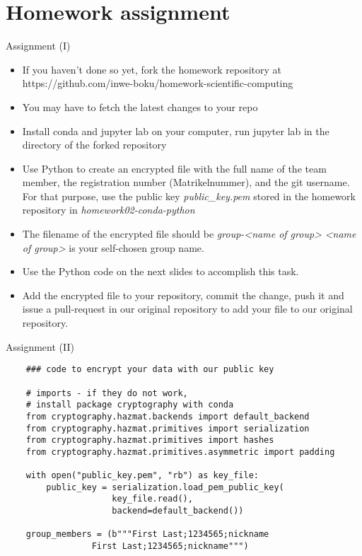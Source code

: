 \section{Homework assignment}

\begin{frame}{Assignment (I)}
	
	\begin{itemize}
		\item If you haven't done so yet, fork the homework repository at https://github.com/inwe-boku/homework-scientific-computing
		\item You may have to fetch the latest changes to your repo
		\item Install conda and jupyter lab on your computer, run jupyter lab in the directory of the forked repository
		\item Use Python to create an encrypted file with the full name of the team member, the registration number (Matrikelnummer), and the git username. For that purpose, use the public key \textit{public\_key.pem} stored in the homework repository in \textit{homework02-conda-python}
		\item The filename of the encrypted file should be \textit{group-<name of group>} \textit{<name of group>} is your self-chosen group name.
		\item Use the Python code on the next slides to accomplish this task.
		\item Add the encrypted file to your repository, commit the change, push it and issue a pull-request in our original repository to add your file to our original repository.
		
		
	\end{itemize}
	
	
\end{frame}

\begin{frame}[fragile]{Assignment (II)}
	
	\begin{verbatim}
	### code to encrypt your data with our public key
	
	# imports - if they do not work,
	# install package cryptography with conda
	from cryptography.hazmat.backends import default_backend
	from cryptography.hazmat.primitives import serialization
	from cryptography.hazmat.primitives import hashes
	from cryptography.hazmat.primitives.asymmetric import padding
	
	with open("public_key.pem", "rb") as key_file:
	    public_key = serialization.load_pem_public_key(
	                 key_file.read(),
	                 backend=default_backend())
		
	group_members = (b"""First Last;1234565;nickname
                 First Last;1234565;nickname""")
	
	
	\end{verbatim}
	
\end{frame}


